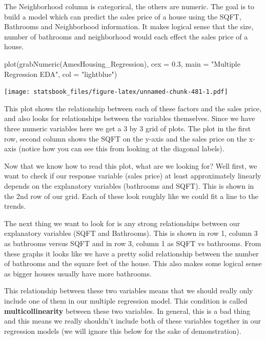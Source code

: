 \documentclass[
]{book}
\newenvironment{Shaded}{\begin{snugshade}}{\end{snugshade}}
\newcommand{\AttributeTok}[1]{\textcolor[rgb]{0.77,0.63,0.00}{#1}}
\newcommand{\FloatTok}[1]{\textcolor[rgb]{0.00,0.00,0.81}{#1}}
\newcommand{\FunctionTok}[1]{\textcolor[rgb]{0.00,0.00,0.00}{#1}}
\newcommand{\NormalTok}[1]{#1}
\newcommand{\StringTok}[1]{\textcolor[rgb]{0.31,0.60,0.02}{#1}}
\theoremstyle{definition}
\theoremstyle{definition}
\theoremstyle{definition}
\theoremstyle{definition}
\theoremstyle{remark}
\begin{document}
The Neighborhood column is categorical, the others are numeric. The goal is to build a model which can predict the sales price of a house using the SQFT, Bathrooms and Neighborhood information. It makes logical sense that the size, number of bathrooms and neighborhood would each effect the sales price of a house.

\begin{Shaded}
\begin{Highlighting}[]
\FunctionTok{plot}\NormalTok{(}\FunctionTok{grabNumeric}\NormalTok{(AmesHousing\_Regression), }\AttributeTok{cex =} \FloatTok{0.3}\NormalTok{, }\AttributeTok{main =} \StringTok{"Multiple Regression EDA"}\NormalTok{,}
    \AttributeTok{col =} \StringTok{"lightblue"}\NormalTok{)}
\end{Highlighting}
\end{Shaded}

\texttt{[image: statsbook\_files/figure-latex/unnamed-chunk-481-1.pdf]}

This plot shows the relationship between each of these factors and the sales price, and also looks for relationships between the variables themselves. Since we have three numeric variables here we get a 3 by 3 grid of plots. The plot in the first row, second column shows the SQFT on the y-axis and the sales price on the x-axis (notice how you can see this from looking at the diagonal labels).

Now that we know how to read this plot, what are we looking for? Well first, we want to check if our response variable (sales price) at least approximately linearly depends on the explanatory variables (bathrooms and SQFT). This is shown in the 2nd row of our grid. Each of these look roughly like we could fit a line to the trends.

The next thing we want to look for is any strong relationships between our explanatory variables (SQFT and Bathrooms). This is shown in row 1, column 3 as bathrooms versus SQFT and in row 3, column 1 as SQFT vs bathrooms. From these graphs it looks like we have a pretty solid relationship between the number of bathrooms and the square feet of the house. This also makes some logical sense as bigger houses usually have more bathrooms.

This relationship between these two variables means that we should really only include one of them in our multiple regression model. This condition is called \textbf{multicollinearity} between these two variables. In general, this is a bad thing and this means we really shouldn't include both of these variables together in our regression models (we will ignore this below for the sake of demonstration).
\end{document}
